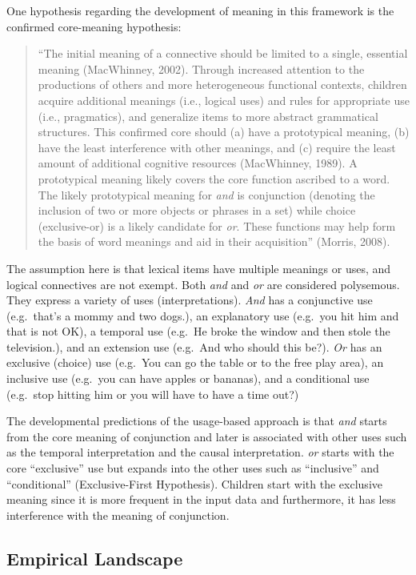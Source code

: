 \documentclass[oneside]{report}
\theoremstyle{definition}
\theoremstyle{definition}
\theoremstyle{definition}
\theoremstyle{remark}
\begin{document}
One hypothesis regarding the development of meaning in this framework is
the confirmed core-meaning hypothesis:
\begin{quote}
``The initial meaning of a connective should be limited to a single,
essential meaning (MacWhinney, 2002). Through increased attention to the
productions of others and more heterogeneous functional contexts,
children acquire additional meanings (i.e., logical uses) and rules for
appropriate use (i.e., pragmatics), and generalize items to more
abstract grammatical structures. This confirmed core should (a) have a
prototypical meaning, (b) have the least interference with other
meanings, and (c) require the least amount of additional cognitive
resources (MacWhinney, 1989). A prototypical meaning likely covers the
core function ascribed to a word. The likely prototypical meaning for
\emph{and} is conjunction (denoting the inclusion of two or more objects
or phrases in a set) while choice (exclusive-or) is a likely candidate
for \emph{or}. These functions may help form the basis of word meanings
and aid in their acquisition'' (Morris, 2008).
\end{quote}
The assumption here is that lexical items have multiple meanings or
uses, and logical connectives are not exempt. Both \emph{and} and
\emph{or} are considered polysemous. They express a variety of uses
(interpretations). \emph{And} has a conjunctive use (e.g.~that's a mommy
and two dogs.), an explanatory use (e.g.~you hit him and that is not
OK), a temporal use (e.g.~He broke the window and then stole the
television.), and an extension use (e.g.~And who should this be?).
\emph{Or} has an exclusive (choice) use (e.g.~You can go the table or to
the free play area), an inclusive use (e.g.~you can have apples or
bananas), and a conditional use (e.g.~stop hitting him or you will have
to have a time out?)

The developmental predictions of the usage-based approach is that
\emph{and} starts from the core meaning of conjunction and later is
associated with other uses such as the temporal interpretation and the
causal interpretation. \emph{or} starts with the core ``exclusive'' use
but expands into the other uses such as ``inclusive'' and
``conditional'' (Exclusive-First Hypothesis). Children start with the
exclusive meaning since it is more frequent in the input data and
furthermore, it has less interference with the meaning of conjunction.

\subsection{Empirical Landscape}\label{empirical-landscape-1}
\end{document}
